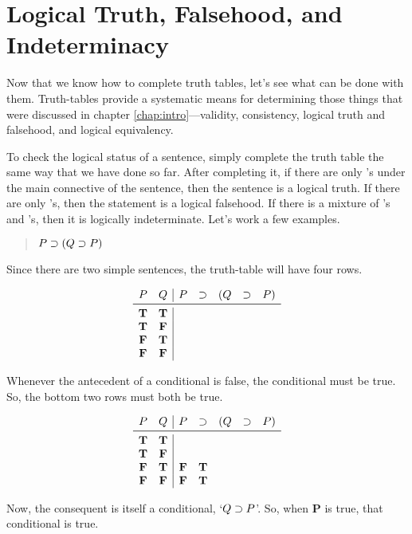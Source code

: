 \documentclass[../logic-text.tex]{subfiles}
\begin{document}
\section{Logical Truth, Falsehood, and Indeterminacy}
\label{sec:taut-contr}

Now that we know how to complete truth tables, let's see what can be done with them.
Truth-tables provide a systematic means for determining those things that were discussed in chapter \ref{chap:intro}---validity, consistency, logical truth and falsehood, and logical equivalency.

To check the logical status of a sentence, simply complete the truth table the same way that we have done so far.
After completing it, if there are only \true 's under the main connective of the sentence, then the sentence is a logical truth.
If there are only \false 's, then the statement is a logical falsehood.
If there is a mixture of \true 's and \false 's, then it is logically indeterminate.
Let's work a few examples.


\begin{quote}
  \(P \supset (Q \supset P)\)
\end{quote}


Since there are two simple sentences, the truth-table will have four rows.


\[
\begin{array}{cc|ccccc}
  P & Q & P & \lif & (Q & \lif & P) \\ \midrule
  \true & \true &&&&& \\
    \true & \false &&&&& \\
  \false & \true &&&&& \\
  \false & \false &&&&& \\
\end{array}
\]


Whenever the antecedent of a conditional is false, the conditional must be true.
So, the bottom two rows must both be true.

\[
\begin{array}{cc|ccccc}
  P & Q & P & \lif & (Q & \lif & P) \\ \midrule
  \true & \true &&&&& \\
    \true & \false &&&&& \\
  \false & \true & \false & \true &&& \\
  \false & \false & \false & \true &&& \\
\end{array}
\]

Now, the consequent is itself a conditional, \enquote*{\(Q \supset P\)}.
So, when \textbf{P} is true, that conditional is true.
\end{document}
